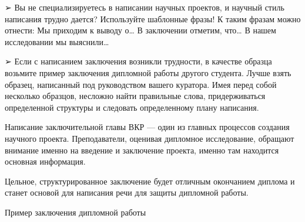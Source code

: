 ➢    Вы не специализируетесь в написании научных проектов, и научный стиль написания трудно дается? Используйте шаблонные фразы! К таким фразам можно отнести:
Мы приходим к выводу о…
В заключении отметим, что…
В нашем исследовании мы выяснили…

➢    Если с написанием заключения возникли трудности, в качестве образца возьмите пример заключения дипломной работы другого студента. Лучше взять образец, написанный под руководством вашего куратора. Имея перед собой несколько образцов, несложно найти правильные слова, придерживаться определенной структуры и следовать определенному плану написания.

Написание заключительной главы ВКР  —  один из главных процессов создания научного проекта. Преподаватели, оценивая дипломное исследование, обращают внимание именно на введение и заключение проекта, именно там находится основная информация.

Цельное, структурированное заключение будет отличным окончанием диплома и станет основой для написания речи для защиты дипломной работы.

Пример заключения дипломной работы


\clearpage